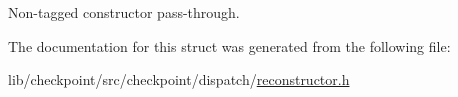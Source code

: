 Non-\/tagged constructor pass-\/through. 



The documentation for this struct was generated from the following file\+:\begin{DoxyCompactItemize}
\item 
lib/checkpoint/src/checkpoint/dispatch/\hyperlink{reconstructor_8h}{reconstructor.\+h}\end{DoxyCompactItemize}
